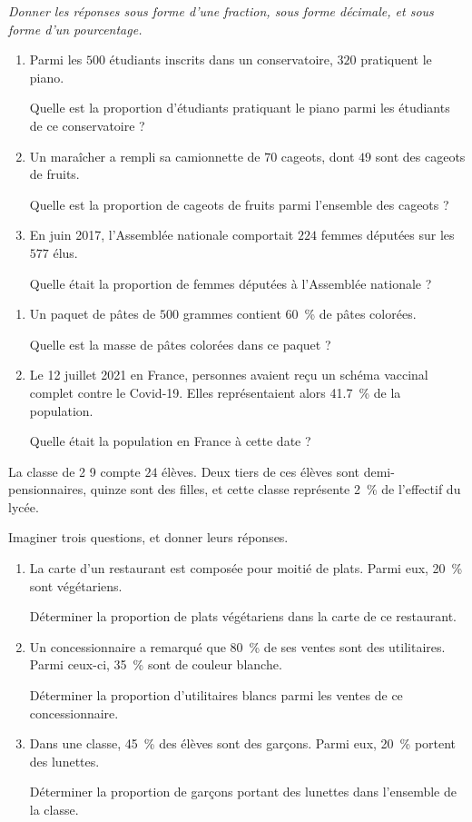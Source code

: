 
\exo

\emph{Donner les réponses sous forme d'une fraction, sous forme décimale, et sous forme d'un pourcentage.}
\begin{enumerate}
\item Parmi les $500$ étudiants inscrits dans un conservatoire, $320$ pratiquent le piano.

Quelle est la proportion d'étudiants pratiquant le piano parmi les étudiants de ce conservatoire ?
\item Un maraîcher a rempli sa camionnette de $70$ cageots, dont $49$ sont des cageots de fruits.

Quelle est la proportion de cageots de fruits parmi l'ensemble des cageots ?
\item En juin 2017, l'Assemblée nationale comportait $224$ femmes députées sur les $577$ élus.

Quelle était la proportion de femmes députées à l'Assemblée nationale ?
\end{enumerate}

\exo

\begin{enumerate}
\item Un paquet de pâtes de $500$ grammes contient \SI{60}{\percent} de pâtes colorées.

Quelle est la masse de pâtes colorées dans ce paquet ?
\item Le 12 juillet 2021 en France,  personnes avaient reçu un schéma vaccinal complet contre le Covid-19. Elles représentaient alors \SI{41,7}{\percent} de la population.

Quelle était la population en France à cette date ?
\end{enumerate}

\exo

La classe de 2 9 compte $24$ élèves. Deux tiers de ces élèves sont demi-pensionnaires, quinze sont des filles, et cette classe représente \SI{2}{\percent} de l'effectif du lycée.

Imaginer trois questions, et donner leurs réponses.

\exo

\begin{enumerate}
\item La carte d'un restaurant est composée pour moitié de plats. Parmi eux, \SI{20}{\percent} sont végétariens.

Déterminer la proportion de plats végétariens dans la carte de ce restaurant.
\item Un concessionnaire a remarqué que \SI{80}{\percent} de ses ventes sont des utilitaires. Parmi ceux-ci, \SI{35}{\percent} sont de couleur blanche.

Déterminer la proportion d'utilitaires blancs parmi les ventes de ce concessionnaire.
\item  Dans une classe, \SI{45}{\percent} des élèves sont des garçons. Parmi eux, \SI{20}{\percent} portent des lunettes.

Déterminer la proportion de garçons portant des lunettes dans l'ensemble de la classe.
\end{enumerate}

